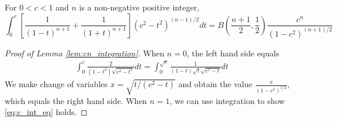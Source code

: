 \documentclass{aptpub}
\begin{document}
\begin{lemma}\label{lem:cn_integration}
For $0<c<1$ and $n$ is a non-negative positive integer,   
\begin{equation}
    \int_0^{c}
    [\frac{1}{(1-t)^{n+1}}+\frac{1}{(1+t)^{n+1}}]
    (c^2- t^2)^{(n-1)/2}dt
    =B(\frac{n+1}{2}, \frac{1}{2})
    \frac{c^n}{(1-c^2)^{(n+1)/2}}
    \end{equation}\label{eq:c_int_eq}
\end{lemma}
\begin{proof}[Proof of Lemma \ref{lem:cn_integration}]
     When $n=0$, the left hand side equals
     \begin{align*}
          \int_0^c \frac{2}{(1-t^2)\sqrt{c^2-t^2}} dt
          = \int_0^{\sqrt{c}} \frac{1}{(1-t) \sqrt{t} \sqrt{c^2-t} }dt
     \end{align*}     
     We make change of variables $x=\sqrt{t/(c^2-t)}$ and obtain
     the value $\frac{\pi}{(1-c^2)^{1/2}}$, which equals
     the right hand side.
     When $n=1$, we can use integration
     to show \eqref{eq:c_int_eq} holds.


\end{proof}
\end{document}
